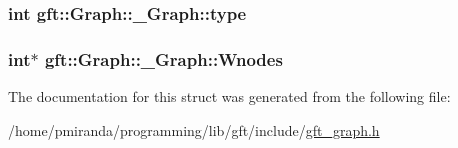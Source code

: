 \subsubsection[{\texorpdfstring{type}{type}}]{\setlength{\rightskip}{0pt plus 5cm}int gft\+::\+Graph\+::\+\_\+\+Graph\+::type}\hypertarget{structgft_1_1Graph_1_1__Graph_a6f711ac38406e18913feef0e7806dbca}{}\label{structgft_1_1Graph_1_1__Graph_a6f711ac38406e18913feef0e7806dbca}
\subsubsection[{\texorpdfstring{Wnodes}{Wnodes}}]{\setlength{\rightskip}{0pt plus 5cm}int$\ast$ gft\+::\+Graph\+::\+\_\+\+Graph\+::\+Wnodes}\hypertarget{structgft_1_1Graph_1_1__Graph_acc6b49e67d937d1007b619632b179cfc}{}\label{structgft_1_1Graph_1_1__Graph_acc6b49e67d937d1007b619632b179cfc}


The documentation for this struct was generated from the following file\+:\begin{DoxyCompactItemize}
\item 
/home/pmiranda/programming/lib/gft/include/\hyperlink{gft__graph_8h}{gft\+\_\+graph.\+h}\end{DoxyCompactItemize}

